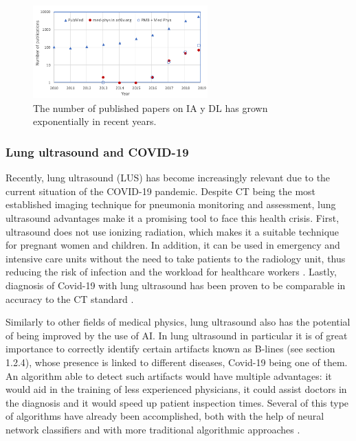 \documentclass[12pt]{article} %
\begin{document}
	
\begin{figure}[h]
\centering
\includegraphics[width=0.6\textwidth]{figuras/DL_papers.png}	
\caption{\small The number of published papers on IA y DL has grown exponentially in recent years. \cite{shen}}
\label{papers}
\end{figure}
	
\subsubsection{Lung ultrasound and COVID-19}
	Recently, lung ultrasound (LUS) has become increasingly relevant due to the current situation of the COVID-19 pandemic. Despite CT being the most established imaging technique for pneumonia monitoring and assessment, lung ultrasound advantages make it a promising tool to face this health crisis. First, ultrasound does not use ionizing radiation, which makes it a suitable technique for pregnant women and children. In addition, it can be used in emergency and intensive care units without the need to take patients to the radiology unit, thus reducing the risk of infection and the workload for healthcare workers \cite{allinovi}. Lastly, diagnosis of Covid-19 with lung ultrasound has been proven to be comparable in accuracy to the CT standard \cite{ottaviani}.
	

	Similarly to other fields of medical physics, lung ultrasound also has the potential of being improved by the use of AI. In lung ultrasound in particular it is of great importance to correctly identify certain artifacts known as B-lines (see section 1.2.4), whose presence is linked to different diseases, Covid-19 being one of them. An algorithm able to detect such artifacts would have multiple advantages: it would aid in the training of less experienced physicians, it could assist doctors in the diagnosis and it would speed up patient inspection times. Several of this type of algorithms have already been accomplished, both with the help of neural network classifiers \cite{vanSloun}\cite{born2020pocovid}\cite{cristiana2020automated}\cite{roy2020deep} and with more traditional algorithmic approaches \cite{brattain}\cite{moshavegh}.
	
\end{document}
